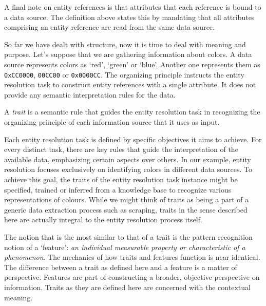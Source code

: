 \documentclass[journal]{IEEEtran}
\begin{document}
    A final note on entity references is that attributes that each reference is
    bound to a data source.
    The definition above states this by mandating that all attributes comprising
    an entity reference are read from the same data source.

    So far we have dealt with structure, now it is time to deal with meaning and
    purpose.    
    Let's suppose that we are gathering information about colors.
    A data source represents colors as `red', `green' or `blue'.
    Another one represents them as \texttt{0xCC0000}, \texttt{00CC00} or
    \texttt{0x0000CC}.
    The organizing principle instructs the entity resolution task to construct
    entity references with a single attribute.
    It does not provide any semantic interpretation rules for the data.
    
    \begin{defn}
        A \textit{trait} is a semantic rule that guides the entity resolution
        task in recognizing the organizing principle of each information source
        that it uses as input.
    \end{defn}

    Each entity resolution task is defined by specific objectives it aims to
    achieve.
    For every distinct task, there are key rules that guide the interpretation
    of the available data, emphasizing certain aspects over others.
    In our example, entity resolution focuses exclusively on identifying colors
    in different data sources.
    To achieve this goal, the traits of the entity resolution task instance
    might be specified, trained or inferred from a knowledge base to recognize
    various representations of colours.
    While we might think of traits as being a part of a generic data extraction
    process such as scraping, traits in the sense described here are actually
    integral to the entity resolution process itself.
    
    The notion that is the most similar to that of a trait is the pattern
    recognition notion of a `feature':
    \textit{an individual measurable property or characteristic of a
    phenomenon}\cite{bishop2006pattern}.
    The mechanics of how traits and features function is near identical.
    The difference between a trait as defined here and a feature is a matter of
    perspective.
    Features are part of constructing a broader, objective perspective on
    information.
    Traits as they are defined here are concerned with the contextual meaning.
    
\end{document}
